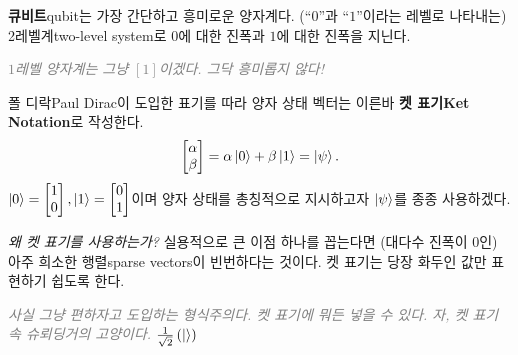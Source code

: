 \documentclass[a4paper,chapter,atbegshi,]{oblivoir}
\begin{document}
\hfill\break

\textbf{큐비트}{\footnotesize qubit}는 가장 간단하고 흥미로운 양자계다.
(``$0$''과 ``$1$''이라는 레벨로 나타내는) 2레벨계{\footnotesize two-level
system}로 $0$에 대한 진폭과 $1$에 대한 진폭을 지닌다.

\hfill

\hfill\parbox[t]{9cm}{\itshape\textcolor{gray}{$1$레벨 양자계는 그냥 $[1]$이겠다.
그닥 흥미롭지 않다!}}

\hfill

폴 디락{\footnotesize Paul Dirac}이 도입한 표기를 따라 양자 상태 벡터는
이른바 \textbf{켓 표기{\footnotesize Ket Notation}}로 작성한다. 
\[
  \begin{bmatrix}\alpha\\\beta\end{bmatrix} 
  = \alpha\ket{0}+\beta\ket{1}=\ket{\psi}.
\]
$\ket0=\begin{bmatrix}1\\0\end{bmatrix}, \ket1=\begin{bmatrix}0\\1
\end{bmatrix}$이며 양자 상태를 총칭적으로 지시하고자 $\ket{\psi}$를 종종
사용하겠다.

\emph{왜 켓 표기를 사용하는가?} 실용적으로 큰 이점 하나를 꼽는다면 (대다수 진폭이
$0$인) 아주 희소한 행렬{\footnotesize sparse vectors}이 빈번하다는 것이다.
켓 표기는 당장 화두인 값만 표현하기 쉽도록 한다. 

\hfill

\hfill\parbox[t]{9cm}{\itshape\textcolor{gray}{사실 그냥 편하자고 도입하는
형식주의다. 켓 표기에 뭐든 넣을 수 있다. 자, 켓 표기 속 슈뢰딩거의 고양이다.
$\frac{1}{\sqrt2}\left(\ket{}\right)$}}
\end{document}
